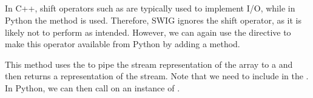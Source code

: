\subsection{ }%
In C++, shift operators such as  are typically used to implement I/O, while in
Python the  method is used.    
Therefore, SWIG ignores the shift operator, as it is likely not to perform as intended. 
However, we can again use the  directive to make this
operator available from Python by adding a   method.
This method uses the  %
to pipe the stream representation of the array to a
 and then returns a 
representation of the stream.
Note that we need to include  in the .
In Python, we can then call  on an instance of .

